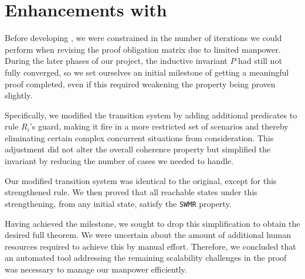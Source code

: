 \documentclass[10pt,conference]{IEEEtran}
\newcommand\SWMR{\texttt{SWMR}}
\begin{document}
\section{Enhancements with \superfix{}}\label{sec:superfix}

\newcommand\pred[2]{\textit{pred}_{#1\_strengthen}\;#2}


Before developing \superfix{}, we were constrained in the number of iterations we could perform when revising the proof obligation matrix due to limited manpower.
During the later phases of our project, the inductive invariant $P$ had still not fully converged, so we set ourselves an initial milestone of getting a meaningful proof completed, even if this required weakening the property being proven slightly.

Specifically, we modified the transition system by adding additional predicates to rule \( R_i \)'s guard, making it fire in a more restricted set of scenarios and thereby eliminating certain complex concurrent situations from consideration. This adjustment did not alter the overall coherence property but simplified the invariant by reducing the number of cases we needed to handle. 

Our modified transition system was identical to the original, except for this strengthened rule. We then proved that all reachable states under this strengthening, from any initial state, satisfy the \SWMR{} property.

Having achieved the milestone, we sought to drop this simplification to obtain the desired full theorem. We were uncertain about the amount of additional human resources required to achieve this by manual effort. Therefore, we concluded that an automated tool addressing the remaining scalability challenges in the proof was necessary to manage our manpower efficiently.



\newcommand\pide{\texttt{PIDE}}


\end{document}

